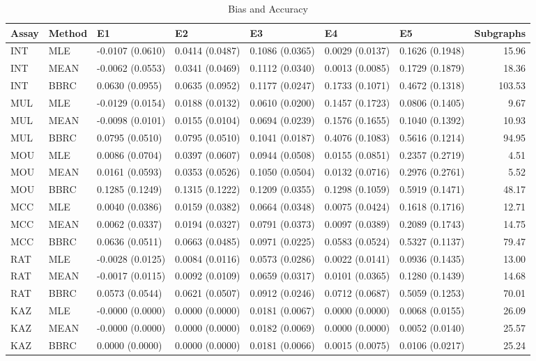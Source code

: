 \begin{table*}[t]
\begin{center}
  \begin{tabular}{lllllllr}
  \hline
 Assay & Method & E1 & E2 & E3 & E4 & E5 & Subgraphs \\ 
  \hline
  INT & MLE & -0.0107 (0.0610) & 0.0414 (0.0487) & 0.1086 (0.0365) & 0.0029 (0.0137) & 0.1626 (0.1948) & 15.96 \\ 
  INT & MEAN & -0.0062 (0.0553) & 0.0341 (0.0469) & 0.1112 (0.0340) & 0.0013 (0.0085) & 0.1729 (0.1879) & 18.36 \\ 
  INT & BBRC & 0.0630 (0.0955) & 0.0635 (0.0952) & 0.1177 (0.0247) & 0.1733 (0.1071) & 0.4672 (0.1318) & 103.53 \\ 
  MUL & MLE & -0.0129 (0.0154) & 0.0188 (0.0132) & 0.0610 (0.0200) & 0.1457 (0.1723) & 0.0806 (0.1405) & 9.67 \\ 
  MUL & MEAN & -0.0098 (0.0101) & 0.0155 (0.0104) & 0.0694 (0.0239) & 0.1576 (0.1655) & 0.1040 (0.1392) & 10.93 \\ 
  MUL & BBRC & 0.0795 (0.0510) & 0.0795 (0.0510) & 0.1041 (0.0187) & 0.4076 (0.1083) & 0.5616 (0.1214) & 94.95 \\ 
  MOU & MLE & 0.0086 (0.0704) & 0.0397 (0.0607) & 0.0944 (0.0508) & 0.0155 (0.0851) & 0.2357 (0.2719) & 4.51 \\ 
  MOU & MEAN & 0.0161 (0.0593) & 0.0353 (0.0526) & 0.1050 (0.0504) & 0.0132 (0.0716) & 0.2976 (0.2761) & 5.52 \\ 
  MOU & BBRC & 0.1285 (0.1249) & 0.1315 (0.1222) & 0.1209 (0.0355) & 0.1298 (0.1059) & 0.5919 (0.1471) & 48.17 \\ 
  MCC & MLE & 0.0040 (0.0386) & 0.0159 (0.0382) & 0.0664 (0.0348) & 0.0075 (0.0424) & 0.1618 (0.1716) & 12.71 \\ 
  MCC & MEAN & 0.0062 (0.0337) & 0.0194 (0.0327) & 0.0791 (0.0373) & 0.0097 (0.0389) & 0.2089 (0.1743) & 14.75 \\ 
  MCC & BBRC & 0.0636 (0.0511) & 0.0663 (0.0485) & 0.0971 (0.0225) & 0.0583 (0.0524) & 0.5327 (0.1137) & 79.47 \\ 
  RAT & MLE & -0.0028 (0.0125) & 0.0084 (0.0116) & 0.0573 (0.0286) & 0.0022 (0.0141) & 0.0936 (0.1435) & 13.00 \\ 
  RAT & MEAN & -0.0017 (0.0115) & 0.0092 (0.0109) & 0.0659 (0.0317) & 0.0101 (0.0365) & 0.1280 (0.1439) & 14.68 \\ 
  RAT & BBRC & 0.0573 (0.0544) & 0.0621 (0.0507) & 0.0912 (0.0246) & 0.0712 (0.0687) & 0.5059 (0.1253) & 70.01 \\ 
  KAZ & MLE & -0.0000 (0.0000) & 0.0000 (0.0000) & 0.0181 (0.0067) & 0.0000 (0.0000) & 0.0068 (0.0155) & 26.09 \\ 
  KAZ & MEAN & -0.0000 (0.0000) & 0.0000 (0.0000) & 0.0182 (0.0069) & 0.0000 (0.0000) & 0.0052 (0.0140) & 25.57 \\ 
  KAZ & BBRC & 0.0000 (0.0000) & 0.0000 (0.0000) & 0.0181 (0.0066) & 0.0015 (0.0075) & 0.0106 (0.0217) & 25.24 \\ 
   \hline
 \end{tabular}
\caption{Bias and Accuracy}
\label{t:anal}
\end{center}
\end{table*}
